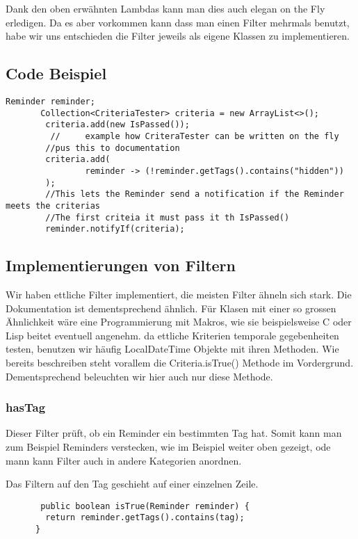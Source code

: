   Dank den oben erwähnten Lambdas kann man dies auch elegan on the Fly erledigen. Da es aber vorkommen kann dass man einen Filter mehrmals benutzt, habe wir uns entschieden die Filter jeweils als eigene Klassen zu implementieren.
  
  \subsection{Code Beispiel}
       \begin{lstlisting}[caption = on the fly criteria]
       Reminder reminder;
       Collection<CriteriaTester> criteria = new ArrayList<>();
        criteria.add(new IsPassed());
         //     example how CriteraTester can be written on the fly
        //pus this to documentation
        criteria.add(
                reminder -> (!reminder.getTags().contains("hidden"))
        );
        //This lets the Reminder send a notification if the Reminder meets the criterias 
        //The first criteia it must pass it th IsPassed()
        reminder.notifyIf(criteria);
       \end{lstlisting}
       
       
       \subsection{Implementierungen von Filtern}
       Wir haben ettliche Filter implementiert, die meisten Filter ähneln sich stark. Die Dokumentation ist dementsprechend ähnlich.
       Für Klasen mit einer so grossen Ähnlichkeit wäre eine Programmierung mit Makros, wie sie beispielsweise C oder Lisp beitet eventuell angenehm. da ettliche Kriterien temporale gegebenheiten testen, benutzen wir häufig  LocalDateTime  Objekte mit ihren Methoden.
       Wie bereits beschreiben steht vorallem die Criteria.isTrue() Methode im Vordergrund. Dementsprechend  beleuchten wir hier auch nur diese Methode.
       
       \subsubsection{hasTag}
       Dieser Filter prüft, ob ein Reminder ein bestimmten Tag hat. Somit kann man zum Beispiel Reminders verstecken, wie im Beispiel weiter oben gezeigt,
       ode mann kann Filter auch in andere Kategorien anordnen. 
       
       Das Filtern auf den Tag geschieht auf einer einzelnen Zeile.
      \begin{lstlisting}
       public boolean isTrue(Reminder reminder) {
	    return reminder.getTags().contains(tag);
      }
      \end{lstlisting}
      
